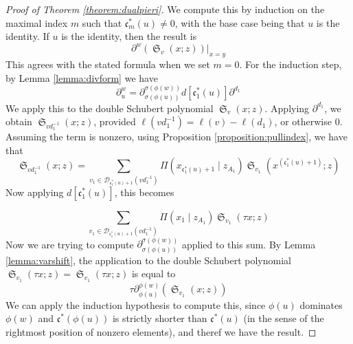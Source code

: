 \documentclass[reqno]{amsart}
\theoremstyle{definition}
\theoremstyle{remark}
\numberwithin{equation}{subsection}
\DeclareMathOperator{\sch}{\mathfrak{S}}
\newcommand{\smpfu}{\mathsf{\Pi}}
\newcommand{\smpre}[2]{\ensuremath{}\smpfu\left( #1 \mid #2\right)}
\newcommand{\shifthom}{\tau}
\newcommand{\code}{\mathfrak{c}}
\begin{document}
\begin{proof}[Proof of Theorem \ref{theorem:dualpieri}]
We compute this by induction on the maximal index $m$ such that $\code_m^*(u)\neq 0$, with the base case being that $u$ is the identity. If $u$ is the identity, then the result is
$$\partial^w(\sch_v(x;z))|_{x=y}$$
This agrees with the stated formula when we set $m=0$. For the induction step, by Lemma \ref{lemma:divform} we have
$$\partial_u^w=\partial^{\sigma(\phi(w))}_{\sigma(\phi(u))}d[\code^*_1(u)]\partial^{d_1}$$
We apply this to the double Schubert polynomial $\sch_v(x;z)$. Applying $\partial^{d_1}$, we obtain $\sch_{vd_1^{-1}}(x;z)$, provided $\ell(vd_1^{-1})=\ell(v)-\ell(d_1)$, or otherwise $0$. Assuming the term is nonzero, using Proposition \ref{proposition:pullindex}, we have that
$$\sch_{vd_1^{-1}}(x;z)=\sum_{v_1\in \mathcal{D}_{\code_1^*(u)+1}(vd_1^{-1})}\smpre{x_{\code^*_1(u)+1}}{z_{A_1}}\sch_{v_1}(x^{(\code_1^*(u)+1)};z)$$
Now applying $d[\code^*_1(u)]$, this becomes

$$\sum_{v_1\in \mathcal{D}_{\code_1^*(u)+1}(vd_1^{-1})}\smpre{x_1}{z_{A_1}}\sch_{v_1}(\shifthom x;z)$$
Now we are trying to compute $\partial^{\sigma(\phi(w))}_{\sigma(\phi(u))}$ applied to this sum. By Lemma \ref{lemma:varshift}, the application to the double Schubert polynomial $\sch_{v_1}(\shifthom x;z)=\sch_{v_1}(\shifthom x;z)$ is equal to 
$$\shifthom\partial^{\phi(w)}_{\phi(u)}(\sch_{v_1}(x;z))$$ 
We can apply the induction hypothesis to compute this, since $\phi(u)$ dominates $\phi(w)$ and $\code^*(\phi(u))$ is strictly shorter than  $\code^*(u)$ (in the sense of the rightmost position of nonzero elements), and theref we have the result.
\end{proof}
\end{document}
